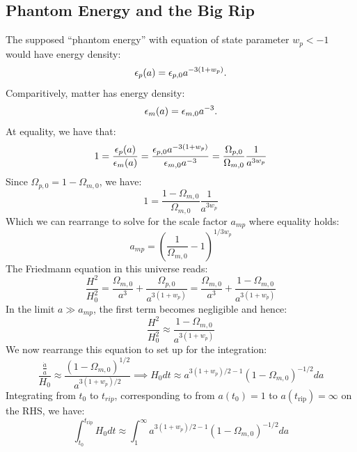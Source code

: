 \subsection{Phantom Energy and the Big Rip}
The supposed ``phantom energy'' with equation of state parameter $w_p < -1$ would have energy density:
\begin{equation}
    \epsilon_p(a) = \epsilon_{p, 0}a^{-3(1+w_p)}.
\end{equation}
Comparitively, matter has energy density:
\begin{equation}
    \epsilon_{m}(a) = \epsilon_{m, 0}a^{-3}.
\end{equation}
At equality, we have that:
\begin{equation}
    1 = \frac{\epsilon_{p}(a)}{\epsilon_{m}(a)} = \frac{\epsilon_{p, 0}a^{-3(1+w_p)}}{\epsilon_{m, 0}a^{-3}} = \frac{\Omega_{p, 0}}{\Omega_{m, 0}}\frac{1}{a^{3w_p}}
\end{equation}
Since $\Omega_{p, 0} = 1 - \Omega_{m, 0}$, we have:
\begin{equation}
    1 = \frac{1 - \Omega_{m, 0}}{\Omega_{m, 0}}\frac{1}{a^{3w_p}}
\end{equation}
Which we can rearrange to solve for the scale factor $a_{mp}$ where equality holds:
\begin{equation}
    \boxed{a_{mp} = \left(\frac{1}{\Omega_{m, 0}} - 1\right)^{1/3w_p}}
\end{equation}
The Friedmann equation in this universe reads:
\begin{equation}
    \frac{H^2}{H_0^2} = \frac{\Omega_{m, 0}}{a^3} + \frac{\Omega_{p, 0}}{a^{3(1+w_p)}} = \frac{\Omega_{m, 0}}{a^3} + \frac{1 - \Omega_{m, 0}}{a^{3(1+w_p)}}
\end{equation}
In the limit $a \gg a_{mp}$, the first term becomes negligible and hence:
\begin{equation}
    \frac{H^2}{H_0^2} \approx \frac{1 - \Omega_{m, 0}}{a^{3(1+w_p)}}
\end{equation}
We now rearrange this equation to set up for the integration:
\begin{equation}
    \frac{\frac{\dot{a}}{a}}{H_0} \approx \frac{(1 - \Omega_{m, 0})^{1/2}}{a^{3(1+w_p)/2}} \implies H_0 dt \approx a^{3(1+w_p)/2-1}(1 - \Omega_{m, 0})^{-1/2}da
\end{equation}
Integrating from $t_0$ to $t_{rip}$, corresponding to from $ a(t_0) = 1$ to $a(t_{\text{rip}}) = \infty$ on the RHS, we have:
\begin{equation}\label{int55}
    \int_{t_0}^{t_{\text{rip}}}H_0 dt  \approx \int_1^\infty a^{3(1+w_p)/2-1}(1 - \Omega_{m, 0})^{-1/2}da
\end{equation}
